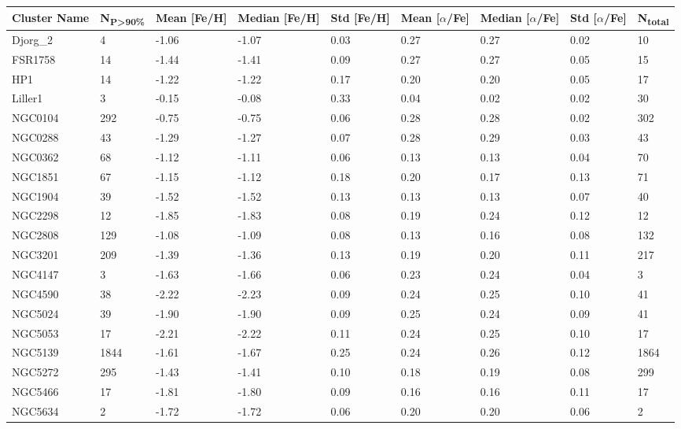 \documentclass[a4paper,12pt]{article}
\begin{document}
\begin{small}   
\begin{center}
    \begin{longtable}{|p{2cm}|p{1cm}|p{1.5cm}|p{1.5cm}|p{1.5cm}|p{1.5cm}|p{1.5cm}|p{1.5cm}|p{2cm}|}
        \hline
        Cluster Name & N\textsubscript{P>90\%} & Mean [Fe/H] & Median [Fe/H] & Std [Fe/H] & Mean [$\alpha$/Fe] & Median [$\alpha$/Fe] & Std [$\alpha$/Fe] & N\textsubscript{total} \\
      \hline
      Djorg\_2 & 4 & -1.06 & -1.07 & 0.03 & 0.27 & 0.27 & 0.02 &10\\
      FSR1758 & 14 & -1.44 & -1.41 & 0.09 & 0.27 & 0.27 & 0.05 &15\\
      HP1 & 14 & -1.22 & -1.22 & 0.17 & 0.20 & 0.20 & 0.05 &17\\
      Liller1 & 3 & -0.15 & -0.08 & 0.33 & 0.04 & 0.02 & 0.02 &30\\
      NGC0104 & 292 & -0.75 & -0.75 & 0.06 & 0.28 & 0.28 & 0.02 &302\\
      NGC0288 & 43 & -1.29 & -1.27 & 0.07 & 0.28 & 0.29 & 0.03 &43\\
      NGC0362 & 68 & -1.12 & -1.11 & 0.06 & 0.13 & 0.13 & 0.04 &70\\
      NGC1851 & 67 & -1.15 & -1.12 & 0.18 & 0.20 & 0.17 & 0.13 &71\\
      NGC1904 & 39 & -1.52 & -1.52 & 0.13 & 0.13 & 0.13 & 0.07 &40\\
      NGC2298 & 12 & -1.85 & -1.83 & 0.08 & 0.19 & 0.24 & 0.12 &12\\
      NGC2808 & 129 & -1.08 & -1.09 & 0.08 & 0.13 & 0.16 & 0.08 &132\\
      NGC3201 & 209 & -1.39 & -1.36 & 0.13 & 0.19 & 0.20 & 0.11 &217\\
      NGC4147 & 3 & -1.63 & -1.66 & 0.06 & 0.23 & 0.24 & 0.04 &3\\
      NGC4590 & 38 & -2.22 & -2.23 & 0.09 & 0.24 & 0.25 & 0.10 &41\\
      NGC5024 & 39 & -1.90 & -1.90 & 0.09 & 0.25 & 0.24 & 0.09 &41\\
      NGC5053 & 17 & -2.21 & -2.22 & 0.11 & 0.24 & 0.25 & 0.10 &17\\
      NGC5139 & 1844 & -1.61 & -1.67 & 0.25 & 0.24 & 0.26 & 0.12 &1864\\
      NGC5272 & 295 & -1.43 & -1.41 & 0.10 & 0.18 & 0.19 & 0.08 &299\\
      NGC5466 & 17 & -1.81 & -1.80 & 0.09 & 0.16 & 0.16 & 0.11 &17\\
      NGC5634 & 2 & -1.72 & -1.72 & 0.06 & 0.20 & 0.20 & 0.06 &2\\

\end{longtable}
\end{center}
\end{small}
\end{document}
